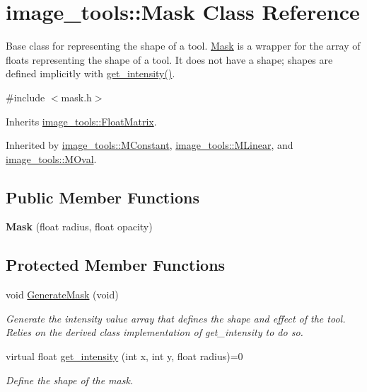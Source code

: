 \hypertarget{classimage__tools_1_1Mask}{}\section{image\+\_\+tools\+:\+:Mask Class Reference}
\label{classimage__tools_1_1Mask}


Base class for representing the shape of a tool. \hyperlink{classimage__tools_1_1Mask}{Mask} is a wrapper for the array of floats representing the shape of a tool. It does not have a shape; shapes are defined implicitly with \hyperlink{classimage__tools_1_1Mask_a72f63a05779159c4f5e2bfea21160c8a}{get\+\_\+intensity()}.  




{\ttfamily \#include $<$mask.\+h$>$}



Inherits \hyperlink{classimage__tools_1_1FloatMatrix}{image\+\_\+tools\+::\+Float\+Matrix}.



Inherited by \hyperlink{classimage__tools_1_1MConstant}{image\+\_\+tools\+::\+M\+Constant}, \hyperlink{classimage__tools_1_1MLinear}{image\+\_\+tools\+::\+M\+Linear}, and \hyperlink{classimage__tools_1_1MOval}{image\+\_\+tools\+::\+M\+Oval}.

\subsection*{Public Member Functions}
\begin{DoxyCompactItemize}
\item 
{\bfseries Mask} (float radius, float opacity)\hypertarget{classimage__tools_1_1Mask_a5a5cfe28b70dbced61e970f189f83488}{}\label{classimage__tools_1_1Mask_a5a5cfe28b70dbced61e970f189f83488}

\end{DoxyCompactItemize}
\subsection*{Protected Member Functions}
\begin{DoxyCompactItemize}
\item 
void \hyperlink{classimage__tools_1_1Mask_acbb15ffd3c486510b556d70bdc4a7740}{Generate\+Mask} (void)\hypertarget{classimage__tools_1_1Mask_acbb15ffd3c486510b556d70bdc4a7740}{}\label{classimage__tools_1_1Mask_acbb15ffd3c486510b556d70bdc4a7740}

\begin{DoxyCompactList}\small\item\em Generate the intensity value array that defines the shape and effect of the tool. Relies on the derived class implementation of get\+\_\+intensity to do so. \end{DoxyCompactList}\item 
virtual float \hyperlink{classimage__tools_1_1Mask_a72f63a05779159c4f5e2bfea21160c8a}{get\+\_\+intensity} (int x, int y, float radius)=0
\begin{DoxyCompactList}\small\item\em Define the shape of the mask. \end{DoxyCompactList}\end{DoxyCompactItemize}
